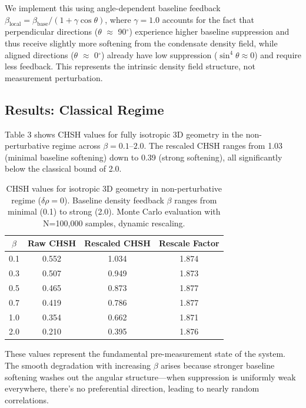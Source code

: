 \documentclass[11pt,a4paper]{article}
\theoremstyle{definition}
\theoremstyle{remark}
\begin{document}
We implement this using angle-dependent baseline feedback $\beta_{\mathrm{local}} = \beta_{\mathrm{base}} / (1 + \gamma \cos\theta)$, where $\gamma = 1.0$ accounts for the fact that perpendicular directions ($\theta$ $\approx$ 90$^\circ$) experience higher baseline suppression and thus receive slightly more softening from the condensate density field, while aligned directions ($\theta$ $\approx$ 0$^\circ$) already have low suppression ($\sin^4\theta \approx 0$) and require less feedback. This represents the intrinsic density field structure, not measurement perturbation.

\subsection{Results: Classical Regime}

Table 3 shows CHSH values for fully isotropic 3D geometry in the non-perturbative regime across $\beta = 0.1$--$2.0$. The rescaled CHSH ranges from 1.03 (minimal baseline softening) down to 0.39 (strong softening), all significantly below the classical bound of 2.0.

\begin{table}[h]
\centering
\caption{CHSH values for isotropic 3D geometry in non-perturbative regime ($\delta\rho = 0$). Baseline density feedback $\beta$ ranges from minimal (0.1) to strong (2.0). Monte Carlo evaluation with N=100,000 samples, dynamic rescaling.}
\label{P8:tab:isotropic_nonpert_chsh}
\begin{tabular}{c|c|c|c}
\hline
$\beta$ & Raw CHSH & Rescaled CHSH & Rescale Factor \\
\hline
0.1 & 0.552 & 1.034 & 1.874 \\
0.3 & 0.507 & 0.949 & 1.873 \\
0.5 & 0.465 & 0.873 & 1.877 \\
0.7 & 0.419 & 0.786 & 1.877 \\
1.0 & 0.354 & 0.662 & 1.871 \\
2.0 & 0.210 & 0.395 & 1.876 \\
\hline
\end{tabular}
\end{table}

These values represent the fundamental pre-measurement state of the system. The smooth degradation with increasing $\beta$ arises because stronger baseline softening washes out the angular structure---when suppression is uniformly weak everywhere, there's no preferential direction, leading to nearly random correlations.
\end{document}
